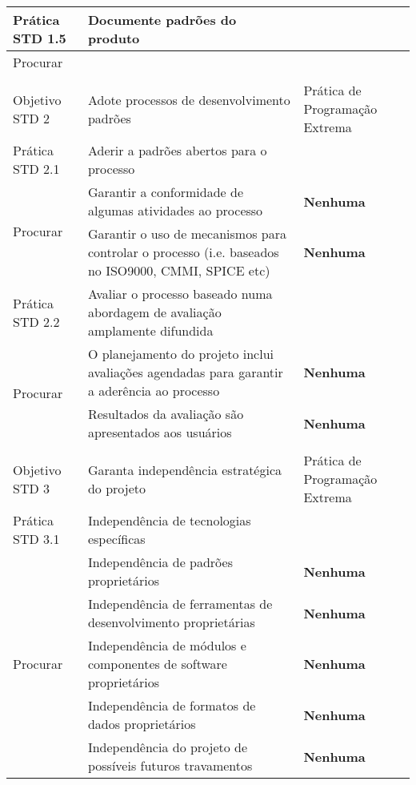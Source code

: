 \begin{longtable}{|p{2cm}|p{7cm}|p{7cm}|}
  \hline \cellcolor[gray]{0.9} Prática STD 1.5 & \cellcolor[gray]{0.9}
  Documente padrões do produto & \\
  \hline \multirow{1}{*}{Procurar} & & \\
  \hline
  & & \\
  \hline \cellcolor[gray]{0.6} Objetivo STD 2 & \cellcolor[gray]{0.6}
  Adote processos de desenvolvimento padrões & Prática de Programação Extrema \\
  \hline \cellcolor[gray]{0.9} Prática STD 2.1 & \cellcolor[gray]{0.9}
  Aderir a padrões abertos para o processo & \\
  \hline \multirow{2}{*}{Procurar} & Garantir a conformidade de
  algumas atividades ao processo &
  \textbf{Nenhuma} \\
  \cline{2-3} & Garantir o uso de mecanismos para controlar o processo
  (i.e. baseados no ISO9000, CMMI, SPICE etc)&
  \textbf{Nenhuma} \\
  \hline \cellcolor[gray]{0.9} Prática STD 2.2 & \cellcolor[gray]{0.9}
  Avaliar o processo baseado numa abordagem de
  avaliação amplamente difundida & \\
  \hline \multirow{2}{*}{Procurar} & O planejamento do projeto inclui
  avaliações agendadas para garantir a aderência ao processo &
  \textbf{Nenhuma} \\
  \cline{2-3} & Resultados da avaliação são apresentados aos usuários
  &
  \textbf{Nenhuma} \\
  \hline
  & & \\
  \hline \cellcolor[gray]{0.6} Objetivo STD 3 & \cellcolor[gray]{0.6}
  Garanta independência estratégica do projeto & Prática de Programação Extrema \\
  \hline \cellcolor[gray]{0.9} Prática STD 3.1 & \cellcolor[gray]{0.9}
  Independência de tecnologias específicas & \\
  \hline \multirow{5}{*}{Procurar} & Independência de padrões
  proprietários &
  \textbf{Nenhuma} \\
  \cline{2-3} & Independência de ferramentas de desenvolvimento
  proprietárias &
  \textbf{Nenhuma} \\
  \cline{2-3} & Independência de módulos e componentes de software
  proprietários &
  \textbf{Nenhuma} \\
  \cline{2-3} & Independência de formatos de dados proprietários &
  \textbf{Nenhuma} \\
  \cline{2-3} & Independência do projeto de possíveis futuros
  travamentos &
  \textbf{Nenhuma} \\
  \hline
\end{longtable}


